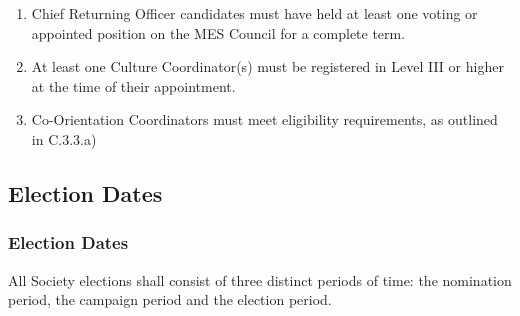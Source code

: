 \begin{enumerate}
 \item
  Chief Returning Officer candidates must have held at least one voting
  or appointed position on the MES Council for a complete term.
 \item
  At least one Culture Coordinator(s) must be registered in Level III or
  higher at the time of their appointment.
 \item
  Co-Orientation Coordinators must meet eligibility requirements, as
  outlined in C.3.3.a)

\end{enumerate}

\hypertarget{election-dates}{%
 \subsection{Election Dates}
 \label{election-dates}}

\hypertarget{election-dates-1}{%
 \subsubsection{Election Dates}
 \label{election-dates-1}}
All Society elections shall consist of three distinct periods of time:
the nomination period, the campaign period and the election period.

